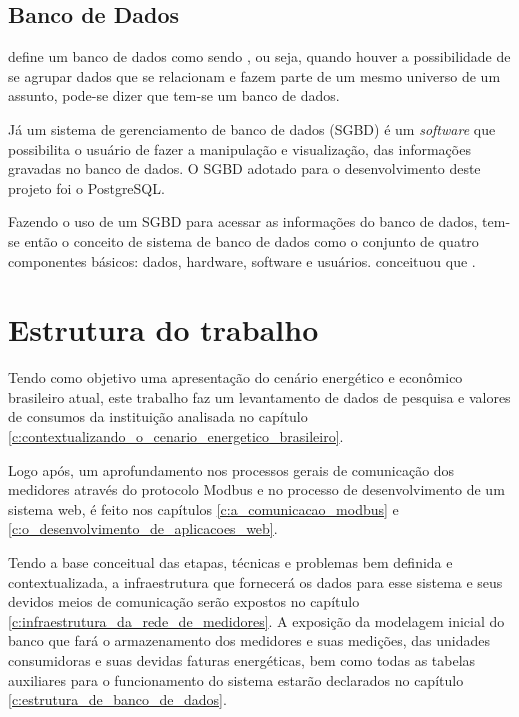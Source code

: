\newpage
\subsection{Banco de Dados}

 define um banco de dados como sendo , ou seja, quando houver a possibilidade de se agrupar dados que se relacionam e fazem parte de um mesmo universo de um assunto, pode-se dizer que tem-se um banco de dados.

Já um sistema de gerenciamento de banco de dados (SGBD) é um \textit{software} que possibilita o usuário de fazer a manipulação e visualização, das informações gravadas no banco de dados. O SGBD adotado para o desenvolvimento deste projeto foi o PostgreSQL.

Fazendo o uso de um SGBD para acessar as informações do banco de dados, tem-se então o conceito de sistema de banco de dados como o conjunto de quatro componentes básicos: dados, hardware, software e usuários. \cite{date2004} conceituou que .


\section{Estrutura do trabalho}

Tendo como objetivo uma apresentação do cenário energético e econômico brasileiro atual, este trabalho faz um levantamento de dados de pesquisa e valores de consumos da instituição analisada no capítulo \ref{c:contextualizando_o_cenario_energetico_brasileiro}.

Logo após, um aprofundamento nos processos gerais de comunicação dos medidores através do protocolo Modbus e no processo de desenvolvimento de um sistema web, é feito nos capítulos \ref{c:a_comunicacao_modbus} e \ref{c:o_desenvolvimento_de_aplicacoes_web}.

Tendo a base conceitual das etapas, técnicas e problemas bem definida e contextualizada, a infraestrutura que fornecerá os dados para esse sistema e seus devidos meios de comunicação serão expostos no capítulo \ref{c:infraestrutura_da_rede_de_medidores}.
A exposição da modelagem inicial do banco que fará o armazenamento dos medidores e suas medições, das unidades consumidoras e suas devidas faturas energéticas, bem como todas as tabelas auxiliares para o funcionamento do sistema estarão declarados no capítulo \ref{c:estrutura_de_banco_de_dados}.

